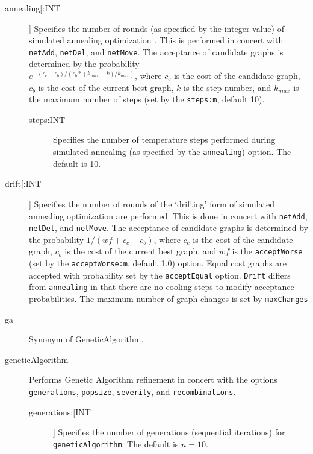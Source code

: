 	\begin{description}
		\item[annealing[:INT]] Specifies the number of rounds (as specified by the integer 
		value) of simulated annealing optimization \citep{Metropolisetal1953, 
		Kirkpatricketal1983, Cerny1985}. This is performed in concert with \texttt{netAdd}, 
		\texttt{netDel}, and \texttt{netMove}. The acceptance of candidate graphs is 
		determined by the probability\\ $e ^ {- (c_c - c_b)/ (c_b * (k_{max} -k)/ k_{max})}$, 
		where $c_c$ is the cost of the candidate graph, $c_b$ is the cost of the current 
		best graph, $k$ is the step number, and $k_{max}$ is the maximum number of 
		steps (set by the \texttt{steps:m}, default 10).

		\begin{description}
			\item[steps:INT] Specifies the number of temperature steps performed 
			during simulated annealing (as specified by the \texttt{annealing}) option.
			The default is 10.
		\end{description}
			
		\item[drift[:INT]] Specifies the number of rounds of the `drifting' form of simulated 
		annealing optimization \citep{goloboff1999} are performed. This is done in concert 
		with \texttt{netAdd}, \texttt{netDel}, and \texttt{netMove}. The acceptance of candidate 
		graphs is determined by the probability $1/ (wf + c_c - c_b)$, where $c_c$ is the cost 
		of the candidate graph, $c_b$ is the cost of the current best graph, and $wf$ is the 
		\texttt{acceptWorse} (set by the \texttt{acceptWorse:m}, default 1.0) option. Equal 
		cost graphs are accepted with probability set by the \texttt{acceptEqual} option. 
		\texttt{Drift} differs from \texttt{annealing} in that there are no cooling steps to modify 
		acceptance probabilities. The maximum number of graph changes is set by 
		\texttt{maxChanges}
				
		\item[ga] Synonym of GeneticAlgorithm.
		
		\item[geneticAlgorithm] Performs Genetic Algorithm \citep{Holland1975} refinement in 
		concert with the options \texttt{generations}, \texttt{popsize}, \texttt{severity}, and 
		\texttt{recombinations}. 
			
			\begin{description}
			\item[generations:[INT]] Specifies the number of generations (sequential iterations) for 
			\texttt{geneticAlgorithm}. The default is $n=10$.


\end{description}
\end{description}
